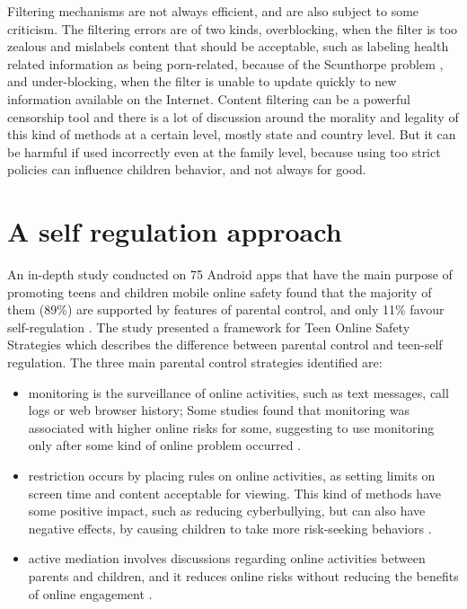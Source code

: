 Filtering mechanisms are not always efficient, and are also subject to some criticism. The filtering errors are of two kinds, overblocking, when the filter is too zealous and mislabels content that should be acceptable, such as labeling health related information as being porn-related, because of the Scunthorpe problem \citep{anh2015scunthorpe}, and under-blocking, when the filter is unable to update quickly to new information available on the Internet. Content filtering can be a powerful censorship tool and there is a lot of discussion around the morality and legality of this kind of methods at a certain level, mostly state and country level. But it can be harmful if used incorrectly even at the family level, because using too strict policies can influence children behavior, and not always for good.


\section{A self regulation approach}

An in-depth study conducted on 75 Android apps that have the main purpose of promoting teens and children mobile online safety found that the majority of them (89\%) are supported by features of parental control, and only 11\% favour self-regulation \citep{wisniewski2017parental}. The study presented a framework for Teen Online Safety Strategies which describes the difference between parental control and teen-self regulation. The three main parental control strategies identified are:

\begin{itemize}
\item monitoring is the surveillance of online activities, such as text messages, call logs or web browser history; Some studies found that monitoring was associated with higher online risks for some, suggesting to use monitoring only after some kind of online problem occurred \citep{duerager2012can}.
\item restriction occurs by placing rules on online activities, as setting limits on screen time and content acceptable for viewing. This kind of methods have some positive impact, such as reducing cyberbullying, but can also have negative effects, by causing children to take more risk-seeking behaviors \citep{shin2014exploring}.
\item active mediation involves discussions regarding online activities between parents and children, and it reduces online risks without reducing the benefits of online engagement \citep{duerager2012can}.
\end{itemize}

